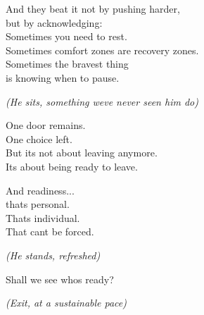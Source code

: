 And they beat it not by pushing harder,\\
but by acknowledging:\\
Sometimes you need to rest.\\
Sometimes comfort zones are recovery zones.\\
Sometimes the bravest thing\\
is knowing when to pause.

\emph{(He sits, something we\textquotesingle ve never seen him do)}

One door remains.\\
One choice left.\\
But it\textquotesingle s not about leaving anymore.\\
It\textquotesingle s about being ready to leave.

And readiness...\\
that\textquotesingle s personal.\\
That\textquotesingle s individual.\\
That can\textquotesingle t be forced.

\emph{(He stands, refreshed)}

Shall we see who\textquotesingle s ready?

\emph{(Exit, at a sustainable pace)}

\bookdivider
